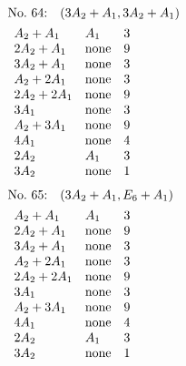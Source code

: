 %
%
\begin{align*}
&\hbox to 4cm {\textrm{No.~64:}\quad$(3A_{2}+A_{1}, 3A_{2}+A_{1})$\hss}\\ 
&\begin{array}{lll}
A_{2}+A_{1} & A_{1} & 3\\
2A_{2}+A_{1} & \none & 9\\
3A_{2}+A_{1} & \none & 3\\
A_{2}+2A_{1} & \none & 3\\
2A_{2}+2A_{1} & \none & 9\\
3A_{1} & \none & 3\\
A_{2}+3A_{1} & \none & 9\\
4A_{1} & \none & 4\\
2A_{2} & A_{1} & 3\\
3A_{2} & \none & 1\\
\end{array}
\end{align*}
%
%
\begin{align*}
&\hbox to 4cm {\textrm{No.~65:}\quad$(3A_{2}+A_{1}, E_{6}+A_{1})$\hss}\\ 
&\begin{array}{lll}
A_{2}+A_{1} & A_{1} & 3\\
2A_{2}+A_{1} & \none & 9\\
3A_{2}+A_{1} & \none & 3\\
A_{2}+2A_{1} & \none & 3\\
2A_{2}+2A_{1} & \none & 9\\
3A_{1} & \none & 3\\
A_{2}+3A_{1} & \none & 9\\
4A_{1} & \none & 4\\
2A_{2} & A_{1} & 3\\
3A_{2} & \none & 1\\
\end{array}
\end{align*}
%
%
